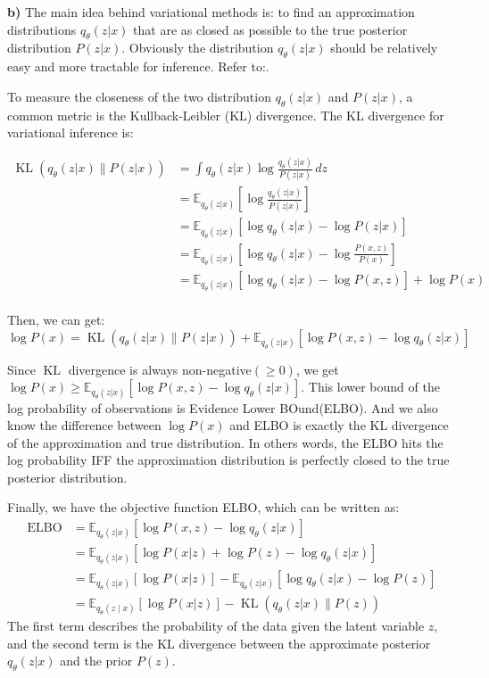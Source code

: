 \documentclass{homework}
\begin{document}
\textbf{b)} The main idea behind variational methods is: to find an approximation distributions $q_{\theta}(z|x)$ that are as closed as possible to the true posterior distribution $P(z|x)$. Obviously the distribution $q_{\theta}(z|x)$ should be relatively easy and more tractable for inference. Refer to:\cite{patacchiola_evidence_2021,noauthor_understanding_nodate}.

To measure the closeness of the two distribution $q_{\theta}(z|x)$ and $P(z|x)$, a common metric is the Kullback-Leibler (KL) divergence. The KL divergence for variational inference is:

$$
\begin{aligned}
\operatorname{KL}(q_{\theta}(z | x) \| P(z | x)) 
&=\int q_{\theta}(z | x) \log \frac{q_{\theta}(z | x)}{P(z | x)} \,dz \\
&=\mathbb{E}_{q_{\theta}(z | x)}\left[\log \frac{q_{\theta}(z | x)}{P(z | x)}\right] \\
&=\mathbb{E}_{q_{\theta}(z | x)}\left[\log q_{\theta}(z | x)-\log P(z | x)\right] \\
&=\mathbb{E}_{q_{\theta}(z | x)}\left[\log q_{\theta}(z | x)-\log \frac{P(x, z)}{P(x)}\right] \\
&=\mathbb{E}_{q_{\theta}(z | x)}\left[\log q_{\theta}(z | x)-\log P(x, z)\right]+\log P(x) \\
\end{aligned}
$$

Then, we can get:
$$
\log P(x)=\operatorname{KL}(q_{\theta}(z | x) \| P(z | x))+\mathbb{E}_{q_{\theta}(z | x)}\left[\log P(x, z)-\log q_{\theta}(z | x)\right]
$$

Since $\operatorname{KL}$ divergence is always non-negative$(\geq0)$, we get $\log P(x) \geq \mathbb{E}_{q_{\theta}(z | x)}\left[\log P(x, z)-\log q_{\theta}(z | x)\right]$. This lower bound of the log probability of observations is Evidence Lower BOund(ELBO). And we also know the difference between $\log P(x)$ and ELBO is exactly the KL divergence of the approximation and true distribution. In others words, the ELBO hits the log probability IFF the approximation distribution is perfectly closed to the true posterior distribution.

Finally, we have the objective function ELBO, which can be written as:
$$
\begin{aligned}
\mathrm{ELBO}
&=\mathbb{E}_{q_{\theta}(z | x)}\left[\log P(x, z)-\log q_{\theta}(z | x)\right] \\
&=\mathbb{E}_{q_{\theta}(z | x)}\left[\log P(x | z)+\log P(z)-\log q_{\theta}(z | x)\right] \\
&=\mathbb{E}_{q_{\theta}(z | x)}\left[\log P(x | z)\right]-\mathbb{E}_{q_{\theta}(z | x)}\left[\log q_{\theta}(z | x)-\log P(z)\right] \\
&=\mathbb{E}_{q_{\theta}(z \mid x)}[\log P(x | z)]-\operatorname{KL}\left(q_{\theta}(z | x) \| P(z)\right)
\end{aligned}
$$
The first term describes the probability of the data given the latent variable $z$, and the second term is the KL divergence between the approximate posterior $q_{\theta}(z | x)$ and the prior $P(z)$.
\end{document}
